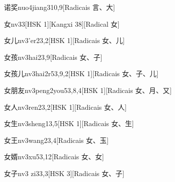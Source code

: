 \begin{entry}{诺奖}{nuo4jiang3}{10,9}[Radicais ⾔、⼤]
\end{entry}

\begin{entry}{女}{nv3}{3}[HSK 1][Kangxi 38][Radical ⼥]
\end{entry}

\begin{entry}{女儿}{nv3'er2}{3,2}[HSK 1][Radicais ⼥、⼉]
\end{entry}

\begin{entry}{女孩}{nv3hai2}{3,9}[Radicais ⼥、⼦]
\end{entry}

\begin{entry}{女孩儿}{nv3hai2r5}{3,9,2}[HSK 1][Radicais ⼥、⼦、⼉]
\end{entry}

\begin{entry}{女朋友}{nv3peng2you5}{3,8,4}[HSK 1][Radicais ⼥、⽉、⼜]
\end{entry}

\begin{entry}{女人}{nv3ren2}{3,2}[HSK 1][Radicais ⼥、⼈]
\end{entry}

\begin{entry}{女生}{nv3sheng1}{3,5}[HSK 1][Radicais ⼥、⽣]
\end{entry}

\begin{entry}{女王}{nv3wang2}{3,4}[Radicais ⼥、⽟]
\end{entry}

\begin{entry}{女婿}{nv3xu5}{3,12}[Radicais ⼥、⼥]
\end{entry}

\begin{entry}{女子}{nv3 zi3}{3,3}[HSK 3][Radicais ⼥、⼦]
\end{entry}


